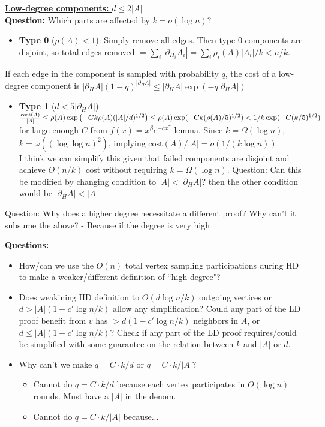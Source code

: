 \documentclass{article}
\begin{document}
	\vspace{1cm}
	\noindent \underline{\large \textbf{Low-degree components:} $d \leq 2\left| A \right|$}\\
	\textbf{Question:} Which parts are affected by $k = o(\log n)$?
	\begin{itemize}
		\item \textbf{ Type 0 } ($\rho(A) < 1$): Simply remove all edges. Then type 0 components are disjoint, so total edges removed $ = \sum_i |\partial_{H_i} A_i| = \sum_i \rho_i(A) |A_i| / k < n / k$.
	\end{itemize}
	If each edge in the component is sampled with probability $q$, the cost of a low-degree component is $|\partial_H A| (1 - q)^{|\partial_H A|} \le |\partial_H A|\exp(-q |\partial_H A|)$
	\begin{itemize}
		\item \textbf{ Type 1 } ($d < 5|\partial_H A|$): $\frac{\text{cost}(A)}{|A|} \le \rho(A)\exp\left(-C k \rho(A) (|A|/d)^{1/2}\right) \le \rho(A)\exp(-C k (\rho(A)/ 5)^{1/2}) \\< 1/k \exp(-C(k/5)^{1/2})$ for large enough $C$ from $f(x) = x^\beta e^{-ax^\gamma}$ lemma. Since $k = \Omega(\log n)$, $k = \omega((\log \log n)^2)$, implying $\text{cost}(A) / |A| = o(1/(k \log n))$.\\
		 I think we can simplify this given that failed components are disjoint and achieve $O(n/ k)$ cost without requiring $k = \Omega (\log n)$.
		Question: Can this be modified by changing condition to $|A| < |\partial_H A|$? then the other condition would be $|\partial_H A| < |A|$
	\end{itemize}
	Question: Why does a higher degree necessitate a different proof? Why can't it subsume the above?
	 - Because if the degree is very high 

	\textbf{Questions:}
	\begin{itemize}
		\item How/can we use the $O(n)$ total vertex sampling participations during HD to make a weaker/different definition of ``high-degree"?
		\item Does weakining HD definition to $O(d \log n / k)$ outgoing vertices or $d > |A|(1 + c'\log n / k)$ allow any simplification? Could any part of the LD proof benefit from $ v $ has $> d(1 - c'\log n/k)$ neighbors in $A$, or $d \le |A|(1 + c'\log n/k)$? Check if any part of the LD proof requires/could be simplified with some guarantee on the relation between $k$ and $|A|$ or $d$.

		\item Why can't we make $q = C \cdot k / d$ or $q = C\cdot k/|A|$?
			\begin{itemize}
				\item Cannot do $q = C\cdot k / d$ because each vertex participates in $O(\log n)$ rounds. Must have a $|A|$ in the denom.
				\item Cannot do $q = C\cdot k / |A|$ because...
			\end{itemize}
		
	\end{itemize}
\end{document}
